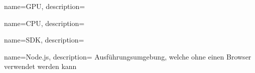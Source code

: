 {
  name={GPU},
  description={{}}
}

{
  name={CPU},
  description={{}}
}

{
  name={SDK},
  description={{}}
}

{
  name={Node.js},
  description={{ Ausführungsumgebung, welche ohne einen Browser verwendet werden kann}}
}
